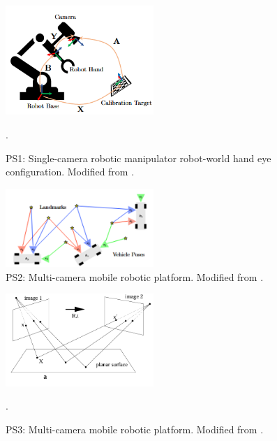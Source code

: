 \documentclass[12pt]{article}
\begin{document}
\begin{figure}[h!]
  \begin{center}
  \centering\includegraphics[width=0.5\textwidth]{Images/Wang_EOH.png}
  \caption{PS1: Single-camera robotic manipulator robot-world hand eye 
  configuration. Modified from \cite{Wang_2022}.}.
  \label{Wang_EOH}
  \end{center}
\end{figure}

\begin{figure}[ht!]
  \begin{center}
  \centering\includegraphics[width=0.5\textwidth]{Images/OASIS_RevVar.png}
  \caption{PS2: Multi-camera mobile robotic platform. 
  Modified from \cite{OASIS_2024}.}
  \label{OASIS}
  \end{center}
\end{figure}

\begin{figure}[ht!]
  \begin{center}
  \centering\includegraphics[width=0.5\textwidth]{Images/MULTIVIEW.png}
  \caption{PS3: Multi-camera mobile robotic platform. 
  Modified from \cite{Hartley_Zisserman}.}.
  \label{MV_HZ}
  \end{center}
\end{figure}
\end{document}

